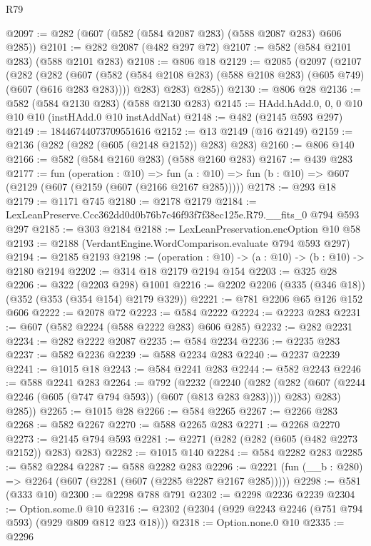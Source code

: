 \begin{lexlean}{R79}
\begin{coremodule}
@2097 := @282 (@607 (@582 (@584 @2087 @283) (@588 @2087 @283) @606 @285))
@2101 := @282 @2087 (@482 @297 @72)
@2107 := @582 (@584 @2101 @283) (@588 @2101 @283)
@2108 := @806 @18
@2129 := @2085
    (@2097
      (@2107
        (@282
          (@282
            (@607 (@582 (@584 @2108 @283) (@588 @2108 @283) (@605 @749) (@607 (@616 @283 @283))))
            @283)
          @283)
        @285))
@2130 := @806 @28
@2136 := @582 (@584 @2130 @283) (@588 @2130 @283)
@2145 := HAdd.hAdd.{0, 0, 0} @10 @10 @10 (instHAdd.{0} @10 instAddNat)
@2148 := @482 (@2145 @593 @297)
@2149 := 18446744073709551616
@2152 := @13 @2149 (@16 @2149)
@2159 := @2136 (@282 (@282 (@605 (@2148 @2152)) @283) @283)
@2160 := @806 @140
@2166 := @582 (@584 @2160 @283) (@588 @2160 @283)
@2167 := @439 @283
@2177 := fun (operation : @10) =>
  fun (a : @10) => fun (b : @10) => @607 (@2129 (@607 (@2159 (@607 (@2166 @2167 @285)))))
@2178 := @293 @18
@2179 := @1171 @745
@2180 := @2178 @2179
@2184 := LexLeanPreserve.Ccc362dd0d0b76b7c46f93f7f38ec125e.R79.__fits_0 @794 @593 @297
@2185 := @303 @2184
@2188 := LexLeanPreservation.encOption @10 @58
@2193 := @2188 (VerdantEngine.WordComparison.evaluate @794 @593 @297)
@2194 := @2185 @2193
@2198 := (operation : @10) -> (a : @10) -> (b : @10) -> @2180 @2194
@2202 := @314 @18 @2179 @2194 @154
@2203 := @325 @28
@2206 := @322 (@2203 @298) @1001
@2216 := @2202 @2206 (@335 (@346 @18)) (@352 (@353 (@354 @154) @2179 @329))
@2221 := @781 @2206 @65 @126 @152 @606
@2222 := @2078 @72
@2223 := @584 @2222
@2224 := @2223 @283
@2231 := @607 (@582 @2224 (@588 @2222 @283) @606 @285)
@2232 := @282 @2231
@2234 := @282 @2222 @2087
@2235 := @584 @2234
@2236 := @2235 @283
@2237 := @582 @2236
@2239 := @588 @2234 @283
@2240 := @2237 @2239
@2241 := @1015 @18
@2243 := @584 @2241 @283
@2244 := @582 @2243
@2246 := @588 @2241 @283
@2264 := @792
    (@2232
      (@2240
        (@282 (@282 (@607 (@2244 @2246 (@605 (@747 @794 @593)) (@607 (@813 @283 @283)))) @283) @283)
        @285))
@2265 := @1015 @28
@2266 := @584 @2265
@2267 := @2266 @283
@2268 := @582 @2267
@2270 := @588 @2265 @283
@2271 := @2268 @2270
@2273 := @2145 @794 @593
@2281 := @2271 (@282 (@282 (@605 (@482 @2273 @2152)) @283) @283)
@2282 := @1015 @140
@2284 := @584 @2282 @283
@2285 := @582 @2284
@2287 := @588 @2282 @283
@2296 := @2221 (fun (__b : @280) => @2264 (@607 (@2281 (@607 (@2285 @2287 @2167 @285)))))
@2298 := @581 (@333 @10)
@2300 := @2298 @788 @791
@2302 := @2298 @2236 @2239
@2304 := Option.some.{0} @10
@2316 := @2302 (@2304 (@929 @2243 @2246 (@751 @794 @593) (@929 @809 @812 @23 @18)))
@2318 := Option.none.{0} @10
@2335 := @2296

\end{coremodule}
\end{lexlean}
